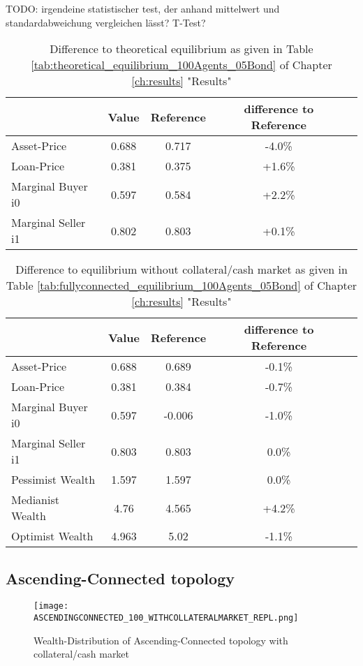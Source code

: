 \documentclass[Bachelorarbeit.tex]{subfiles}
\begin{document}
TODO: irgendeine statistischer test, der anhand mittelwert und standardabweichung vergleichen lässt?
T-Test?

\begin{table}[h]
	\caption{Difference to theoretical equilibrium as given in Table \ref{tab:theoretical_equilibrium_100Agents_05Bond} of Chapter \ref{ch:results} "Results"}
	\centering
	\begin{tabular} { l c c c r }
		& Value & Reference & difference to Reference \\
		\hline
		Asset-Price & 0.688 & 0.717 & -4.0\% \\
		Loan-Price & 0.381 & 0.375 & +1.6\% \\
		Marginal Buyer i0 & 0.597 & 0.584 & +2.2\% \\
		Marginal Seller i1 & 0.802 & 0.803 & +0.1\% \\
		\hline
	\end{tabular}
\end{table} 

\begin{table}[h]
	\caption{Difference to equilibrium without collateral/cash market as given in Table \ref{tab:fullyconnected_equilibrium_100Agents_05Bond} of Chapter \ref{ch:results} "Results"}
	\centering
	\begin{tabular} { l c c c r }
		& Value & Reference & difference to Reference \\
		\hline
		Asset-Price & 0.688 & 0.689 & -0.1\% \\
		Loan-Price & 0.381 & 0.384 & -0.7\% \\
		Marginal Buyer i0 & 0.597 & -0.006 & -1.0\% \\
		Marginal Seller i1 & 0.803 & 0.803 & 0.0\% \\
		\hline
		Pessimist Wealth & 1.597 & 1.597 & 0.0\% \\
		Medianist Wealth & 4.76 & 4.565 & +4.2\% \\
		Optimist Wealth & 4.963 & 5.02 & -1.1\% \\
		\hline
	\end{tabular}
\end{table} 


\subsection{Ascending-Connected topology}
\begin{figure}[H]
	\centering
  \texttt{[image: ASCENDINGCONNECTED\_100\_WITHCOLLATERALMARKET\_REPL.png]}
	\caption{Wealth-Distribution of Ascending-Connected topology with collateral/cash market}
	\label{fig:wealth_ASCENDINGCONNECTED_100_WITHCOLLATERALMARKET_REPL}
\end{figure}
\end{document}
